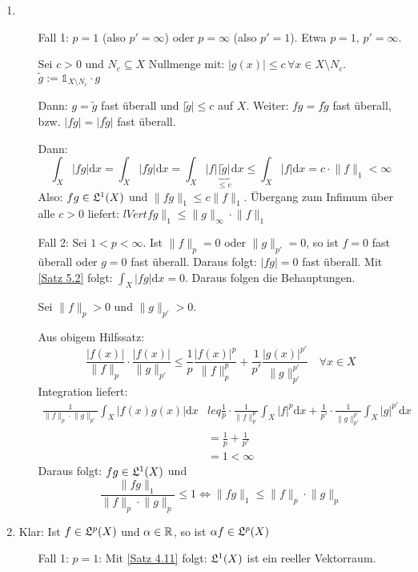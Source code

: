 \documentclass[a4paper,twoside,DIV15,BCOR12mm,chapterprefix=true,headings=onelinechapter]{scrbook}
\begin{document}
\begin{beweis}
\begin{enumerate}
\item
\begin{itemize}
\item[Fall 1:]  \(p=1\) (also \(p'=\infty\)) oder \(p=\infty\) (also \(p'=1\)). Etwa \(p=1,\,p'=\infty\).

Sei \(c>0\) und \(N_{c}\subseteq X\) Nullmenge mit: \(\lvert g(x)\rvert\leq c\,\forall x\in X\setminus N_{c}\). 
\(\tilde{g}:=\mathds{1}_{X\setminus N_{c}}\cdot g\)

Dann: \(g=\tilde{g}\) fast \"uberall und \(\lvert\tilde{g}\rvert\leq c\) auf \(X\). Weiter: \(fg=f\tilde{g}\) fast \"uberall,
bzw. \(\lvert fg\rvert=\lvert f\tilde{g}\rvert\) fast \"uberall.

Dann:
\[
\int_{X}{\lvert fg\rvert\mathrm{d}x}=\int_{X}{\lvert f\tilde{g}\rvert\mathrm{d}x}=\int_{X}{\lvert f\rvert\underbrace{\lvert\tilde{g}\rvert}_{\leq c}\mathrm{d}x}\leq\int_{X}{\lvert f\rvert\mathrm{d}x}=c\cdot\lVert f\rVert_{1}<\infty
\]
Also: \(fg\in\mathfrak{L}^{1}(X)\) und \(\lVert fg\rVert_{1}\leq c\lVert f\rVert_{1}\). \"Ubergang zum Infimum \"uber alle \(c>0\) 
liefert: \(lVert fg\rVert_{1}\leq\lVert g\rVert_{\infty}\cdot\lVert f\rVert_{1}\)
\item[Fall 2:] Sei \(1<p<\infty\). Ist \(\lVert f\rVert_{p}=0\) oder \(\lVert g\rVert_{p'}=0\), so ist \(f=0\) fast \"uberall
oder \(g=0\) fast \"uberall. Daraus folgt: \(\lvert fg\rvert=0\) fast \"uberall.
Mit \ref{Satz 5.2} folgt: \(\int_{X}{\lvert fg\rvert\mathrm{d}x}=0\). Daraus folgen die Behauptungen.


Sei \(\lVert f\rVert_{p}>0\) und \(\lVert g\rVert_{p'}>0\).

Aus obigem Hilfssatz:
\[
\frac{\lvert f(x)\rvert}{\lVert f\rVert_{p}}\cdot\frac{\lvert f(x)\rvert}{\lVert g\rVert_{p'}}\leq\frac{1}{p}\frac{\lvert f(x)\rvert^{p}}{\lVert f\rVert_{p}^{p}}+\frac{1}{p'}\frac{\lvert g(x)\rvert^{p'}}{\lVert g\rVert_{p'}^{p'}}\quad\forall x\in X
\]
Integration liefert:
\begin{align*}
\frac{1}{\lVert f\rVert_{p}\cdot\lVert g\rVert_{p'}}\int_{X}{\lvert f(x)g(x)\rvert\mathrm{d}x}
	&leq\frac{1}{p}\cdot\frac{1}{\lVert f\rVert_{p}^{p}}\int_{X}{\lvert f\rvert^{p}\mathrm{d}x}+
	\frac{1}{p'}\cdot\frac{1}{\lVert g\rVert_{p'}^{p'}}\int_{X}{\lvert g\rvert^{p'}\mathrm{d}x}\\
	&=\frac{1}{p}+\frac{1}{p'}\\
	&=1<\infty
\end{align*}
Daraus folgt: \(fg\in\mathfrak{L}^{1}(X)\) und
\[
\frac{\lVert fg\rVert_{1}}{\lVert f\rVert_{p}\cdot\lVert g\rVert_{p}}\leq 1\Leftrightarrow \lVert fg\rVert_{1}\leq\lVert f\rVert_{p}\cdot\lVert g\rVert_{p}
\]
\end{itemize}
\item Klar: Ist \(f\in\mathfrak{L}^{p}(X)\) und \(\alpha\in\mathbb{R}\), so ist \(\alpha f\in\mathfrak{L}^{p}(X)\)
\begin{itemize}
\item[Fall 1:] \(p=1\): Mit \ref{Satz 4.11} folgt: \(\mathfrak{L}^{1}(X)\) ist ein reeller Vektorraum.


\end{itemize}
\end{enumerate}
\end{beweis}
\end{document}

